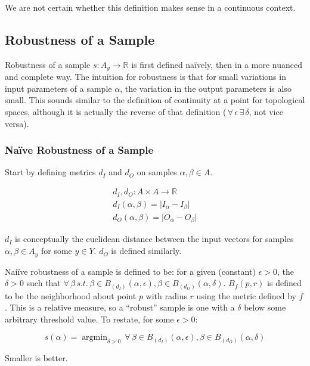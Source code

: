 \documentclass{article}
\DeclareMathOperator*{\argmin}{argmin}
\begin{document}
We are not certain whether this definition makes sense in a continuous context.

\subsection{Robustness of a Sample}
Robustness of a sample $s : A_y \to \mathbb{R}$ is first defined na\"ively, then in a more nuanced and complete way. The intuition for robustness is that for small variations in input parameters of a sample $\alpha$, the variation in the output parameters is also small. This sounds similar to the definition of continuity at a point for topological spaces, although it is actually the reverse of that definition ($\,\forall\, \epsilon \,\exists\, \delta$, not vice versa).

\subsubsection{Na\"ive Robustness of a Sample}

Start by defining metrics $d_I$ and $d_O$ on samples $\alpha, \beta \in A$.

\begin{align}
  d_I, d_O : A \times A \to \mathbb{R} \\
  d_I(\alpha, \beta) = \lvert I_\alpha - I_\beta \rvert \\
  d_O(\alpha, \beta) = \lvert O_\alpha - O_\beta \rvert
\end{align}

$d_I$ is conceptually the euclidean distance between the input vectors for samples $\alpha, \beta \in A_y$ for some $y \in Y$. $d_O$ is defined similarly.

Nai\"ive robustness of a sample is defined to be: for a given (constant) $\epsilon > 0$, the $\delta > 0$ such that $\forall\, \beta \,s.t.\, \beta \in B_{(d_I)}(\alpha, \epsilon), \beta \in B_{(d_O)}(\alpha, \delta)$. $B_f(p, r)$ is defined to be the neighborhood about point $p$ with radius $r$ using the metric defined by $f$. This is a relative measure, so a ``robust'' sample is one with a $\delta$ below some arbitrary threshold value. To restate, for some $\epsilon > 0$:

\begin{equation}
  s(\alpha) = \argmin_{\delta > 0} \,\forall\, \beta \in B_{(d_I)}(\alpha, \epsilon), \beta \in B_{(d_O)}(\alpha, \delta)
\end{equation}

Smaller is better.
\end{document}
